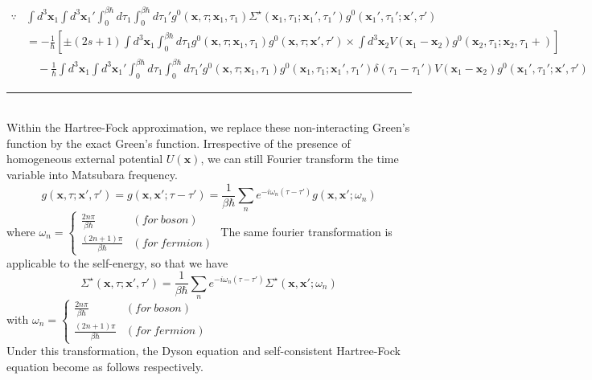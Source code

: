 \[
\begin{aligned}
\because &\int d^3 \mathbf{x}_1 \int d^3 \mathbf{x}_1' \int_0^{\beta\hbar} d\tau_1 \int_0^{\beta\hbar} d\tau_1' g^0(\mathbf{x},\tau;\mathbf{x}_1,\tau_1) \Sigma^\star(\mathbf{x}_1,\tau_1;\mathbf{x}_1',\tau_1') g^0(\mathbf{x}_1',\tau_1';\mathbf{x}',\tau')\\
&=-\frac{1}{\hbar} \left[\pm(2s+1)\int d^3 \mathbf{x}_1 \int_0^{\beta\hbar} d\tau_1 g^0(\mathbf{x},\tau;\mathbf{x}_1,\tau_1) g^0(\mathbf{x},\tau;\mathbf{x}',\tau')\times\int d^3 \mathbf{x}_2 V(\mathbf{x}_1-\mathbf{x}_2) g^0(\mathbf{x}_2,\tau_1;\mathbf{x}_2,\tau_1+)\right]\\
&\quad-\frac{1}{\hbar} \int d^3 \mathbf{x}_1 \int d^3 \mathbf{x}_1' \int_0^{\beta\hbar} d\tau_1 \int_0^{\beta\hbar} d\tau_1' g^0(\mathbf{x},\tau;\mathbf{x}_1,\tau_1) g^0(\mathbf{x}_1,\tau_1;\mathbf{x}_1',\tau_1') \delta(\tau_1-\tau_1') V(\mathbf{x}_1-\mathbf{x}_2) g^0(\mathbf{x}_1',\tau_1';\mathbf{x}',\tau')
\end{aligned}
\]
\rule{\textwidth}{1mm}\\
Within the Hartree-Fock approximation, we replace these non-interacting Green's function by the exact Green's function.
Irrespective of the presence of homogeneous external potential $U(\mathbf{x})$, we can still Fourier transform the time variable into Matsubara frequency.
\begin{equation}
g(\mathbf{x},\tau;\mathbf{x}',\tau')=g(\mathbf{x},\mathbf{x}';\tau-\tau')=\frac{1}{\beta\hbar}\sum_n e^{-i\omega_n(\tau-\tau')} g(\mathbf{x},\mathbf{x}';\omega_n)
\end{equation}
where
$
\omega_n=
\begin{cases}
\frac{2n\pi}{\beta\hbar} & (for\ boson)\\
\frac{(2n+1)\pi}{\beta\hbar} & (for\ fermion)
\end{cases}
$
The same fourier transformation is applicable to the self-energy, so that we have
\begin{equation}
\Sigma^\star(\mathbf{x},\tau;\mathbf{x}',\tau')=\frac{1}{\beta\hbar}\sum_n e^{-i\omega_n(\tau-\tau')} \Sigma^\star(\mathbf{x},\mathbf{x}';\omega_n)
\end{equation}
with $
\omega_n=
\begin{cases}
\frac{2n\pi}{\beta\hbar} & (for\ boson)\\
\frac{(2n+1)\pi}{\beta\hbar} & (for\ fermion)
\end{cases}
$\\
Under this transformation, the Dyson equation and self-consistent Hartree-Fock equation become as follows respectively.
